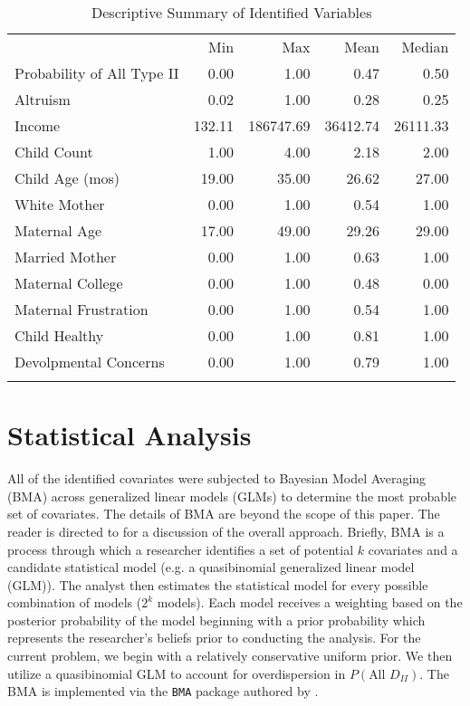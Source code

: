\begin{table}
\caption{Descriptive Summary of Identified Variables}
\label{desc}       %
\begin{tabular}{lrrrr}
    \hline\noalign{\smallskip}
                            & Min & Max & Mean & Median \\
    \noalign{\smallskip}\hline\noalign{\smallskip}
    Probability of All Type II & 0.00 & 1.00 & 0.47 & 0.50 \\
    Altruism & 0.02 & 1.00 & 0.28 & 0.25 \\
    Income & 132.11 & 186747.69 & 36412.74 & 26111.33 \\
    Child Count & 1.00 & 4.00 & 2.18 & 2.00 \\
    Child Age (mos) & 19.00 & 35.00 & 26.62 & 27.00 \\
    White Mother & 0.00 & 1.00 & 0.54 & 1.00 \\
    Maternal Age & 17.00 & 49.00 & 29.26 & 29.00 \\
    Married Mother & 0.00 & 1.00 & 0.63 & 1.00 \\
    Maternal College & 0.00 & 1.00 & 0.48 & 0.00 \\
    Maternal Frustration & 0.00 & 1.00 & 0.54 & 1.00 \\
    Child Healthy & 0.00 & 1.00 & 0.81 & 1.00 \\
    Devolpmental Concerns & 0.00 & 1.00 & 0.79 & 1.00 \\
    \noalign{\smallskip}\hline
\end{tabular}
\end{table}

\section{Statistical Analysis}
All of the identified covariates were subjected to Bayesian Model Averaging (BMA) across generalized linear models (GLMs) to determine the most probable set of covariates. The details of BMA are beyond the scope of this paper. The reader is directed to \citet{Hoeting1999} for a discussion of the overall approach. Briefly, BMA is a process through which a researcher identifies a set of potential $k$ covariates and a candidate statistical model (e.g. a quasibinomial generalized linear model (GLM)). The analyst then estimates the statistical model for every possible combination of models ($2^k$ models). Each model receives a weighting based on the posterior probability of the model beginning with a prior probability which represents the researcher's beliefs prior to conducting the analysis. For the current problem, we begin with a relatively conservative uniform prior. We then utilize a quasibinomial GLM to account for overdispersion in $P(\text{All }D_{II})$. The BMA is implemented via the \texttt{BMA} package authored by \citet{Raftery2009}. 



